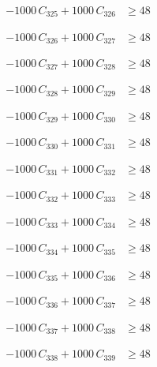 \documentclass[a4paper,11pt]{article}
\begin{document}
\begin{align}
-1000\,C_{325} + 1000\,C_{326} &\geq 48 \nonumber
\end{align}

\begin{align}
-1000\,C_{326} + 1000\,C_{327} &\geq 48 \nonumber
\end{align}

\begin{align}
-1000\,C_{327} + 1000\,C_{328} &\geq 48 \nonumber
\end{align}

\begin{align}
-1000\,C_{328} + 1000\,C_{329} &\geq 48 \nonumber
\end{align}

\begin{align}
-1000\,C_{329} + 1000\,C_{330} &\geq 48 \nonumber
\end{align}

\begin{align}
-1000\,C_{330} + 1000\,C_{331} &\geq 48 \nonumber
\end{align}

\begin{align}
-1000\,C_{331} + 1000\,C_{332} &\geq 48 \nonumber
\end{align}

\begin{align}
-1000\,C_{332} + 1000\,C_{333} &\geq 48 \nonumber
\end{align}

\begin{align}
-1000\,C_{333} + 1000\,C_{334} &\geq 48 \nonumber
\end{align}

\begin{align}
-1000\,C_{334} + 1000\,C_{335} &\geq 48 \nonumber
\end{align}

\begin{align}
-1000\,C_{335} + 1000\,C_{336} &\geq 48 \nonumber
\end{align}

\begin{align}
-1000\,C_{336} + 1000\,C_{337} &\geq 48 \nonumber
\end{align}

\begin{align}
-1000\,C_{337} + 1000\,C_{338} &\geq 48 \nonumber
\end{align}

\begin{align}
-1000\,C_{338} + 1000\,C_{339} &\geq 48 \nonumber
\end{align}
\end{document}

